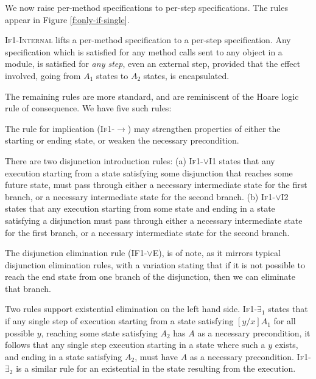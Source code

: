 We now raise per-method \Nec specifications 
to per-step \Nec specifications. 
The rules appear in Figure \ref{f:only-if-single}.

\textsc{If1-Internal} 
 lifts a per-method \Nec specification to a per-step \Nec specification.
Any \Nec specification which is satisfied for any method
calls sent to any object in a module, is satisfied for \emph{any step}, even
an external step, provided that the effect involved, \ie going from $A_1$ states to
$A_2$ states, is encapsulated.

 The remaining rules are more standard, and are reminiscent of the Hoare logic rule of consequence.
 We have five such rules:
 
The  rule for implication (\textsc{If1-$\longrightarrow$}) may strengthen
 properties of either the starting or ending state, or 
weaken the necessary precondition. 

There are two disjunction introduction rules: 
(a) \textsc{If1-$\vee$I1} states that any execution
starting from a state satisfying some disjunction that reaches some future state, 
must pass through either a necessary 
intermediate state for the first branch, or a necessary 
intermediate state for the second branch.
(b) \textsc{If1-$\vee$I2} states that any execution 
starting from some state and ending in a state satisfying a disjunction
must pass through either a necessary intermediate state for 
the first branch, or a necessary intermediate state for the second branch.


The disjunction
elimination rule (\textsc{IF1-$\vee$E}), 
is of note, as it mirrors typical disjunction elimination
rules, with a variation stating that if it is not possible  to reach 
the end state from one branch of the disjunction, then we can eliminate 
that branch. 

Two rules support existential elimination on the left hand side.
\textsc{If1-$\exists_1$} states that if any single step of execution starting
from a state satisfying $[y/x]A_1$ for all possible $y$, reaching some state satisfying
$A_2$ has $A$ as a necessary precondition, it follows that any single step execution
starting in a state where such a $y$ exists, and ending in a state satisfying $A_2$,
must have $A$ as a necessary precondition. \textsc{If1-$\exists_2$} is a similar rule
for an existential in the state resulting from the execution.


